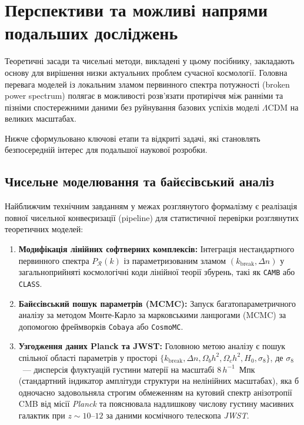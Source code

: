 \chapter{Перспективи та можливі напрями подальших досліджень}
\label{sec:future_research}

Теоретичні засади та чисельні методи, викладені у цьому посібнику, закладають основу для вирішення низки актуальних проблем сучасної космології. Головна перевага моделей із локальним зламом первинного спектра потужності (broken power spectrum) полягає в можливості розв'язати протиріччя між ранніми та пізніми спостережними даними без руйнування базових успіхів моделі $\Lambda$CDM на великих масштабах.

Нижче сформульовано ключові етапи та відкриті задачі, які становлять безпосередній інтерес для подальшої наукової розробки.

\section{Чисельне моделювання та байєсівський аналіз}

Найближчим технічним завданням у межах розглянутого формалізму є реалізація повної чисельної конвеєризації (pipeline) для статистичної перевірки розглянутих теоретичних моделей:
\begin{enumerate}
  \item \textbf{Модифікація лінійних софтверних комплексів:} Інтеграція нестандартного первинного спектра $P_{\mathcal{R}}(k)$ із параметризованим зламом $(k_\mathrm{break}, \Delta n)$ у загальноприйняті космологічні коди лінійної теорії збурень, такі як \texttt{CAMB} або \texttt{CLASS}.
  \item \textbf{Байєсівський пошук параметрів (MCMC):} Запуск багатопараметричного аналізу за методом Монте-Карло за марковськими ланцюгами (MCMC) за допомогою фреймворків \texttt{Cobaya} або \texttt{CosmoMC}.
  \item \textbf{Узгодження даних Planck та JWST:} Головною метою аналізу є пошук спільної області параметрів у просторі $\{k_\mathrm{break}, \Delta n, \Omega_b h^2, \Omega_c h^2, H_0, \sigma_8\}$, де $\sigma_8$~--- дисперсія флуктуацій густини матерії на масштабі $8\,h^{-1}$~Мпк (стандартний індикатор амплітуди структури на нелінійних масштабах), яка б одночасно задовольняла строгим обмеженням на кутовий спектр анізотропії CMB від місії \emph{Planck} та пояснювала надлишкову числову густину масивних галактик при $z \sim 10$--$12$ за даними космічного телескопа \emph{JWST}.
\end{enumerate}

